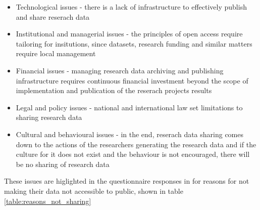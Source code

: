 \begin{itemize}
    \item Technological issues - there is a lack of infrastructure to
          effectively publish and share reserach data
    \item Institutional and managerial issues - the principles of open access
          require tailoring for insitutions, since datasets, research funding
          and similar matters require local management
    \item Financial issues - managing research data archiving and publishing
          infrastructure requires continuous financial investment beyond the
          scope of implementation and publication of the reserach projects
          results
    \item Legal and policy issues - national and international law set
          limitations to sharing research data
    \item Cultural and behavioural issues - in the end, reserach data sharing
          comes down to the actions of the researchers generating the research
          data and if the culture for it does not exist and the behaviour is
          not encouraged, there will be no sharing of research data
\end{itemize}

These issues are higlighted in the questionnaire responses in
\cite{tenopir2011data} for reasons for not making their data not accessible
to public, shown in table \ref{table:reasons_not_sharing}

